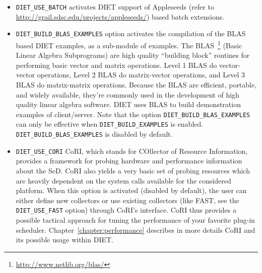 \begin{itemize}
\item
  \verb+DIET_USE_BATCH+  activates DIET support of Appleseeds (refer to
  \url{http://grail.sdsc.edu/projects/appleseeds/}) based batch
  extensions. 

\item
  \verb+DIET_BUILD_BLAS_EXAMPLES+ option activates the compilation of
  the BLAS based DIET examples, as a sub-module of examples.
  The BLAS~\footnote{\url{http://www.netlib.org/blas/}} (Basic Linear
  Algebra Subprograms) are high quality ``building block'' routines for
  performing basic vector and matrix operations.
  Level 1 BLAS do vector-vector operations, Level 2 BLAS do matrix-vector
  operations, and Level 3 BLAS do matrix-matrix operations.
  Because the BLAS are efficient, portable, and widely available,
  they're commonly used in the development of high quality linear algebra
  software.
  DIET uses BLAS to build demonstration examples of client/server.
  Note that the option \verb+DIET_BUILD_BLAS_EXAMPLES+ can only be
  effective when \verb+DIET_BUILD_EXAMPLES+ is enabled.
  \verb+DIET_BUILD_BLAS_EXAMPLES+ is disabled by default.

\item
  \verb+DIET_USE_CORI+ CoRI, which stands for COllector of Resource
  Information, provides a framework for probing hardware and performance
  information about the SeD.
  CoRI also yields a very basic set of probing resources which are
  heavily dependent on the system calls available for the considered platform.
  When this option is activated (disabled by default), the user can either
  define new collectors or use existing collectors (like FAST, see the
  \verb+DIET_USE_FAST+ option) through CoRI's interface.
  CoRI thus provides a possible tactical approach for tuning the performance
  of your favorite plug-in scheduler.
  Chapter~\ref{chapter:performance} describes in more details CoRI and its
  possible usage within DIET.


\end{itemize}
